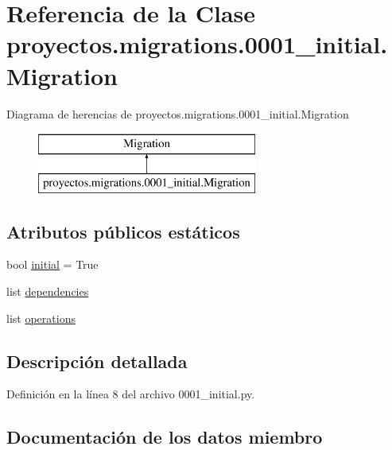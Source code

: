\hypertarget{classproyectos_1_1migrations_1_10001__initial_1_1_migration}{}\section{Referencia de la Clase proyectos.\+migrations.0001\+\_\+initial.Migration}
\label{classproyectos_1_1migrations_1_10001__initial_1_1_migration}
Diagrama de herencias de proyectos.\+migrations.0001\+\_\+initial.Migration\begin{figure}[H]
\begin{center}
\leavevmode
\includegraphics[height=2.000000cm]{classproyectos_1_1migrations_1_10001__initial_1_1_migration}
\end{center}
\end{figure}
\subsection*{Atributos públicos estáticos}
\begin{DoxyCompactItemize}
\item 
bool \hyperlink{classproyectos_1_1migrations_1_10001__initial_1_1_migration_a063694a5526c928b9cbe2a41e19e6536}{initial} = True
\item 
list \hyperlink{classproyectos_1_1migrations_1_10001__initial_1_1_migration_aade2052158dfe1c7cd44262f342334c2}{dependencies}
\item 
list \hyperlink{classproyectos_1_1migrations_1_10001__initial_1_1_migration_a4f85977f400ac7fd376b6f738c1d87bf}{operations}
\end{DoxyCompactItemize}


\subsection{Descripción detallada}


Definición en la línea 8 del archivo 0001\+\_\+initial.\+py.



\subsection{Documentación de los datos miembro}
